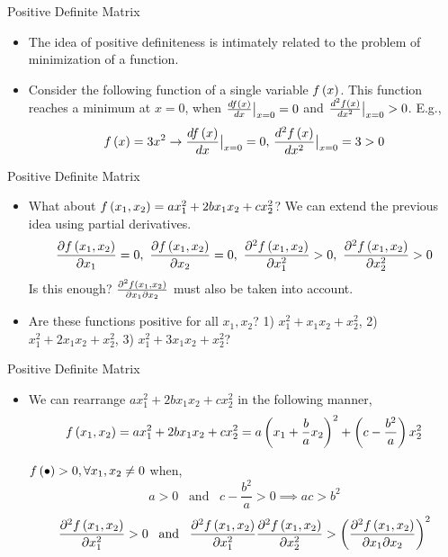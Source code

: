 \documentclass[aspectratio=169]{beamer}
\let\olditem\item
\renewcommand{\item}{\setlength{\itemsep}{\fill}\olditem}
\def\lp{\ensuremath\left(}
\def\rp{\ensuremath\right)}
\begin{document}
\begin{frame}[t]{Positive Definite Matrix}
\begin{itemize}
    \item The idea of positive definiteness is intimately related to the problem of minimization of a function.

    \item Consider the following  function of a single variable $f\lp x\rp$. This function reaches a minimum at $x = 0$, when $\frac{df\lp x\rp}{dx} \big\rvert_{x=0} = 0$ and $\frac{d^2f\lp x\rp}{dx^2} \big\rvert_{x=0} > 0$. E.g.,
    $$f\lp x\rp = 3x^2 \rightarrow \frac{df\lp x\rp}{dx} \big\rvert_{x=0} = 0, \,\frac{d^2f\lp x\rp}{dx^2} \big\rvert_{x=0}  = 3 > 0$$
\end{itemize}
\end{frame}


\begin{frame}[t]{Positive Definite Matrix}
\begin{itemize}
    \item What about $f\lp x_1, x_2 \rp = ax_1^2 + 2bx_1x_2 + cx_2^2$? We can extend the previous idea using partial derivatives.
    \[ \frac{\partial f\lp x_1, x_2 \rp}{\partial x_1} = 0, \,\, \frac{\partial f\lp x_1, x_2 \rp}{\partial x_2} = 0, \,\, \frac{\partial^2 f\lp x_1, x_2 \rp}{\partial x_1^2} > 0, \,\, \frac{\partial^2 f\lp x_1, x_2 \rp}{\partial x_2^2} > 0 \]
    Is this enough? $\frac{\partial^2f\lp x_1, x_2\rp}{\partial x_1 \partial x_2}$ must also be taken into account.

    \item Are these functions positive for all $x_1, x_2$? 1) $x_1^2 + x_1x_2 + x_2^2$, 2) $x_1^2 + 2x_1x_2 + x_2^2$, 3) $x_1^2 + 3x_1x_2 + x_2^2$?
\end{itemize}
\end{frame}


\begin{frame}[t]{Positive Definite Matrix}
\begin{itemize}
    \item We can rearrange $ax_1^2 + 2bx_1x_2 + cx_2^2$ in the following manner,
    \[ f\lp x_1, x_2 \rp = ax_1^2 + 2bx_1x_2 + cx_2^2 = a\lp x_1 + \frac{b}{a}x_2\rp^2 + \lp c - \frac{b^2}{a}\rp x_2^2 \]

    $f\lp\bullet\rp > 0, \forall x_1, x_2 \neq 0$ when,
    \[ a > 0\,\,\,\text{ and }\,\,\,c - \frac{b^2}{a} > 0 \implies ac > b^2 \]
    \[ \frac{\partial^2f\lp x_1, x_2 \rp}{\partial x_1^2} > 0\,\,\,\text{ and }\,\,\,\frac{\partial^2f\lp x_1, x_2 \rp}{\partial x_1^2} \frac{\partial^2f\lp x_1, x_2 \rp}{\partial x_2^2} > \lp\frac{\partial^2 f\lp x_1, x_2 \rp}{\partial x_1 \partial x_2}\rp^2 \]
\end{itemize}
\end{frame}
\end{document}
